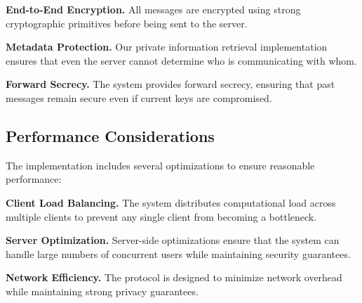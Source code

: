 \textbf{End-to-End Encryption.} All messages are encrypted using strong cryptographic primitives before being sent to the server.

\textbf{Metadata Protection.} Our private information retrieval implementation ensures that even the server cannot determine who is communicating with whom.

\textbf{Forward Secrecy.} The system provides forward secrecy, ensuring that past messages remain secure even if current keys are compromised.

\subsection{Performance Considerations}

The implementation includes several optimizations to ensure reasonable performance:

\textbf{Client Load Balancing.} The system distributes computational load across multiple clients to prevent any single client from becoming a bottleneck.

\textbf{Server Optimization.} Server-side optimizations ensure that the system can handle large numbers of concurrent users while maintaining security guarantees.

\textbf{Network Efficiency.} The protocol is designed to minimize network overhead while maintaining strong privacy guarantees.